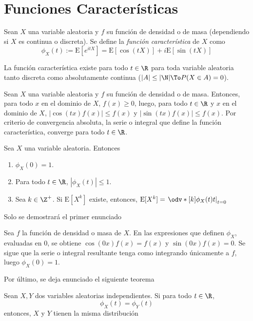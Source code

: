 \section{Funciones Características}
\begin{Def}
  Sean $X$ una variable aleatoria y $f$ su función de densidad o de masa
  (dependiendo si $X$ es continua o discreta). Se define la
  \emph{función característica} de $X$ como
  \[\phi_X(t) := \text{E}[e^{itX}] = \text{E}[\cos(tX)] + i\text{E}[\sin(tX)]\]
\end{Def}

\begin{Teo}
  La función característica existe para todo $t\in\R$ para
  toda variable aleatoria
  tanto discreta como absolutamente continua ($|A|\leq|\N|\To P(X\in A)=0$).
\end{Teo}
\begin{Demo}
  Sean $X$ una variable aleatoria y $f$ su función de densidad o de masa.
  Entonces, para todo $x$ en el dominio de $X$, $f(x)\geq0$,  luego,
  para todo $t\in\R$ y $x$ en el dominio de $X$,
  $|\cos(tx)f(x)|\leq f(x)$ y $|\sin(tx)f(x)|\leq f(x)$.
  Por criterio de convergencia absoluta, la serie o integral que
  define la función característica, converge para todo $t\in\R$.
\end{Demo}

\begin{Teo}\label{Teo:prop_carac}
  Sea $X$ una variable aleatoria. Entonces
  \begin{enumerate}
    \item $\phi_X(0)=1$.
    \item Para todo $t\in\R$, $|\phi_X(t)|\leq 1$.
    \item Sea $k\in\Z^+$. Si $\text{E}[X^k]$ existe, entonces,
    $\text{E}[X^k]=\left.\odv*[k]{\phi_X(t)}{t}\right|_{t=0}$
  \end{enumerate}
\end{Teo}
Solo se demostrará el primer enunciado
\begin{Demo}
  Sea $f$ la función de densidad o masa de $X$. En las expresiones que
  definen $\phi_X$, evaluadas en $0$, se obtiene
  $\cos(0x)f(x)=f(x)$ y $\sin(0x)f(x)=0$.
  Se sigue que la serie o integral resultante tenga como
  integrando únicamente a $f$, luego $\phi_X(0)=1$.
\end{Demo}
Por último, se deja enunciado el siguiente teorema
\begin{Teo}\label{Teo:biy_carac}
  Sean $X,Y$ dos variables aleatorias independientes. Si
  para todo $t\in\R$,
  \[\phi_X(t)=\phi_Y(t)\]
  entonces, $X$ y $Y$ tienen la misma distribución
\end{Teo}